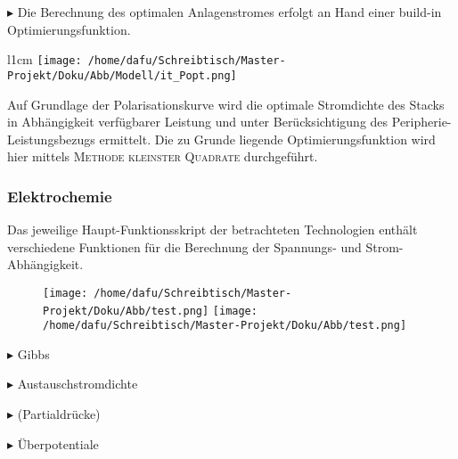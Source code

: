 \documentclass[onecolumn,10pt,titlepage]{article}
\begin{document}
$\blacktriangleright$ Die Berechnung des optimalen Anlagenstromes erfolgt an Hand einer build-in Optimierungsfunktion.
\begin{wrapfigure}{l}{1cm}
	\texttt{[image: /home/dafu/Schreibtisch/Master-Projekt/Doku/Abb/Modell/it\_Popt.png]}
\end{wrapfigure} Auf Grundlage der Polarisationskurve wird die optimale Stromdichte des Stacks in Abhängigkeit verfügbarer Leistung und unter Berücksichtigung des Peripherie-Leistungsbezugs ermittelt. Die zu Grunde liegende Optimierungsfunktion wird hier mittels \textsc{Methode kleinster Quadrate} durchgeführt.







\subsubsection{Elektrochemie}
\label{subsubs_mod_elchem}
Das jeweilige Haupt-Funktionsskript der betrachteten Technologien enthält verschiedene Funktionen für die Berechnung der Spannungs- und Strom-Abhängigkeit. %

\begin{figure}[H]
	
	\centering
	\texttt{[image: /home/dafu/Schreibtisch/Master-Projekt/Doku/Abb/test.png]}
	\texttt{[image: /home/dafu/Schreibtisch/Master-Projekt/Doku/Abb/test.png]}
	\caption{ }
	\label{fig:Strukt_Funkt_elchem} 
\end{figure}


$\blacktriangleright$ Gibbs
\newline

$\blacktriangleright$ Austauschstromdichte
\newline

$\blacktriangleright$ (Partialdrücke)
\newline

$\blacktriangleright$ Überpotentiale
\newline
\end{document}
